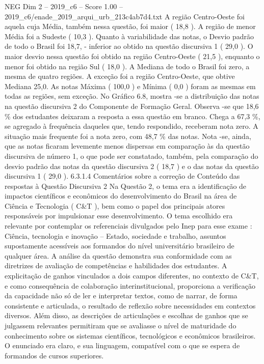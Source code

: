 \begin{textsample}{NEG Dim 2 – 2019\_c6 – Score 1.00 – 2019\_c6/enade\_2019\_arqui\_urb\_213c4ab7d4.txt}
A região Centro-Oeste foi aquela cuja Média, também nessa questão, foi maior ( 18,8 ).
A região de menor Média foi a Sudeste ( 10,3 ).
Quanto à variabilidade das notas, o Desvio padrão de todo o Brasil foi 18,7, - inferior ao obtido na questão discursiva 1 ( 29,0 ).
O maior desvio nessa questão foi obtido na região Centro-Oeste ( 21,5 ), enquanto o menor foi obtido na região Sul ( 18,0 ).
A Mediana de todo o Brasil foi zero, a mesma de quatro regiões.
A exceção foi a região Centro-Oeste, que obtive Mediana 25,0.
As notas Máxima ( 100,0 ) e Mínima ( 0,0 ) foram as mesmas em todas as regiões, sem exceção.
No Gráfico 6.8, mostra -se a distribuição das notas na questão discursiva 2 do Componente de Formação Geral.
Observa -se que 18,6 \% dos estudantes deixaram a resposta a essa questão em branco.
Chega a 67,3 \%, se agregado à frequência daqueles que, tendo respondido, receberam nota zero.
A situação mais frequente foi a nota zero, com 48,7 \% das notas.
Nota -se, ainda, que as notas ficaram levemente menos dispersas em comparação às da questão discursiva de número 1, o que pode ser constatado, também, pela comparação do desvio padrão das notas da questão discursiva 2 ( 18,7 ) e o das notas da questão discursiva 1 ( 29,0 ). 6.3.1.4 Comentários sobre a correção de Conteúdo das respostas à Questão Discursiva 2 Na Questão 2, o tema era a identificação de impactos científicos e econômicos do desenvolvimento do Brasil na área de Ciência e Tecnologia ( C\&T ), bem como o papel dos principais atores responsáveis por impulsionar esse desenvolvimento.
O tema escolhido era relevante por contemplar os referenciais divulgados pelo Inep para esse exame : Ciência, tecnologia e inovação – Estado, sociedade e trabalho, assuntos supostamente acessíveis aos formandos do nível universitário brasileiro de qualquer área.
A análise da questão demonstra sua conformidade com as diretrizes de avaliação de competências e habilidades dos estudantes.
A explicitação de ganhos vinculados a dois campos diferentes, no contexto de C\&T, e como consequência de colaboração interinstitucional, proporciona a verificação da capacidade não só de ler e interpretar textos, como de narrar, de forma consistente e articulada, o resultado de reflexão sobre necessidades em contextos diversos.
Além disso, as descrições de articulações e escolhas de ganhos que se julgassem relevantes permitiram que se avaliasse o nível de maturidade do conhecimento sobre os sistemas científicos, tecnológicos e econômicos brasileiros.
O enunciado era claro, e sua linguagem, compatível com o que se espera de formandos de cursos superiores.

\end{textsample}
